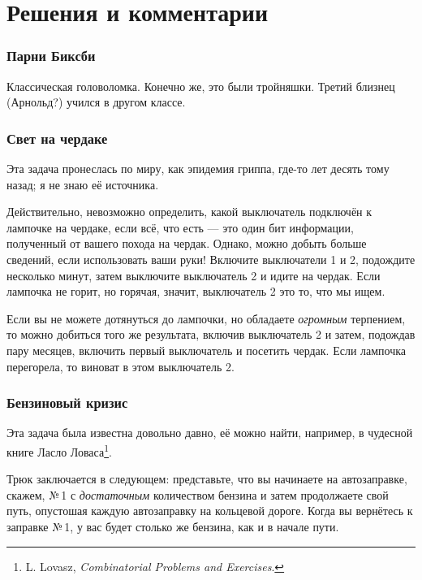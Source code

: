 \section*{Решения и комментарии}

\subsubsection*{Парни Биксби} %

Классическая головоломка.
Конечно же, это были тройняшки.
Третий близнец (Арнольд?) учился в другом классе.

\subsubsection*{Свет на чердаке} %

Эта задача пронеслась по миру, как эпидемия гриппа, где-то лет десять тому назад;
я не знаю её источника.

\medskip

Действительно, невозможно определить, какой выключатель подключён к лампочке на чердаке, если всё, что есть --- это один бит информации, полученный от вашего похода на чердак.
Однако, можно добыть больше сведений, если использовать ваши руки!
Включите выключатели 1 и 2, подождите несколько минут, затем выключите выключатель 2 и идите на чердак.
Если лампочка не горит, но горячая, значит, выключатель 2 это то, что мы ищем.
\heart

Если вы не можете дотянуться до лампочки, но обладаете \emph{огромным} терпением, то можно добиться того же результата, включив  выключатель 2 и затем, подождав пару месяцев, включить первый выключатель и посетить чердак.
Если лампочка перегорела, то виноват в этом выключатель 2.

\subsubsection*{Бензиновый кризис} %

Эта задача была известна довольно давно, её можно найти, например, в чудесной книге Ласло Ловаса\footnote{L. Lovasz, \emph{Combinatorial Problems and Exercises}.}.

\medskip

Трюк заключается в следующем:
представьте, что вы начинаете на автозаправке, скажем, №\,1 с \emph{достаточным} количеством бензина и затем продолжаете свой путь, опустошая каждую автозаправку на кольцевой дороге.
Когда вы вернётесь к заправке №\,1, 
у вас будет столько же бензина, как и в начале пути.

